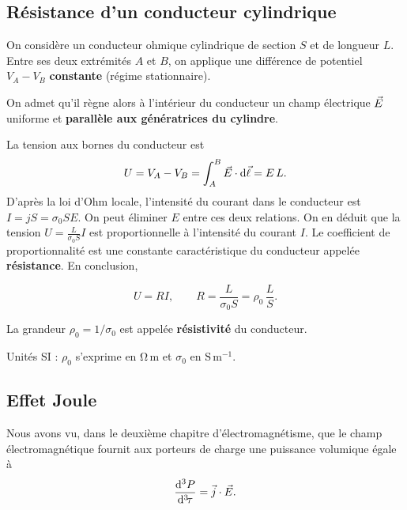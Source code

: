 \documentclass[11pt,a4paper]{article}
\newcommand{\dd}{\mathrm d}
\newcommand{\stars}[1]{\mathord{\star}\ifnum#1>1\mkern5mu\mathord{\star}\fi\ifnum#1>2\mkern5mu\mathord{\star}\fi\ifnum#1>3\mkern5mu\mathord{\star}\fi\ifnum#1>4\mkern5mu\mathord{\star}\fi\ifnum#1>5\mkern5mu\mathord{\star}\fi}
\newenvironment{result}[1][4]{\begin{cadre}[etoiles={\stars{#1}}]}{\end{cadre}}
\newcommand{\vj}{\vec j}\newcommand{\vE}{\vec E}\newcommand{\vB}{\vec B}
\newcommand{\densP}{\frac{\dd^3 P}{\dd^3\!\tau}}
\newcommand{\betoile}[2]{\begin{result}[#1]\[#2\]\end{result}}
\begin{document}
\subsection{Résistance d'un conducteur cylindrique}\label{sec:cylindre}
\noindent\begin{minipage}[c]{.585\linewidth}
On considère un conducteur ohmique cylindrique de section \(S\) et de longueur \(L\).
Entre ses deux extrémités \(A\) et \(B\), on applique une différence de potentiel
\(V_A-V_B\) \textbf{constante} (régime stationnaire).

On admet qu'il règne alors à l'intérieur du conducteur un champ électrique \(\vec E\) uniforme
et \textbf{parallèle aux génératrices du cylindre}.
\end{minipage}\hfill\begin{minipage}[c]{.39\linewidth}\centering
{}
\end{minipage}\par
La tension aux bornes du conducteur est
\[
 U=V_A-V_B=\int_A^B\E\cdot\dd\vec\ell=E\,L .
\]
D'après la loi d'Ohm locale, l'intensité du courant dans le conducteur est
\(I=jS=\sigma_0 SE\). On peut éliminer \(E\) entre ces deux relations. On en déduit que la
tension \(\displaystyle U=\frac{L}{\sigma_0 S}I\) est proportionnelle à l'intensité du courant \(I\).
Le coefficient de proportionnalité est une constante caractéristique du conducteur appelée
\textbf{résistance}. En conclusion,
\betoile{4}{U=RI,\qquad R=\frac{L}{\sigma_0 S}=\rho_0\,\frac{L}{S}.}
La grandeur \(\rho_0=1/\sigma_0\) est appelée \textbf{résistivité} du conducteur.

Unités SI : \(\rho_0\) s'exprime en \(\mathrm{\Omega\,m}\) et \(\sigma_0\) en \(\mathrm{S\,m^{-1}}\).

\subsection{Effet Joule}\label{sec:joule}
Nous avons vu, dans le deuxième chapitre d'électromagnétisme, que le champ électromagnétique
fournit aux porteurs de charge une puissance volumique égale à
\[
 \densP=\vj\cdot\E.
\]
\end{document}
